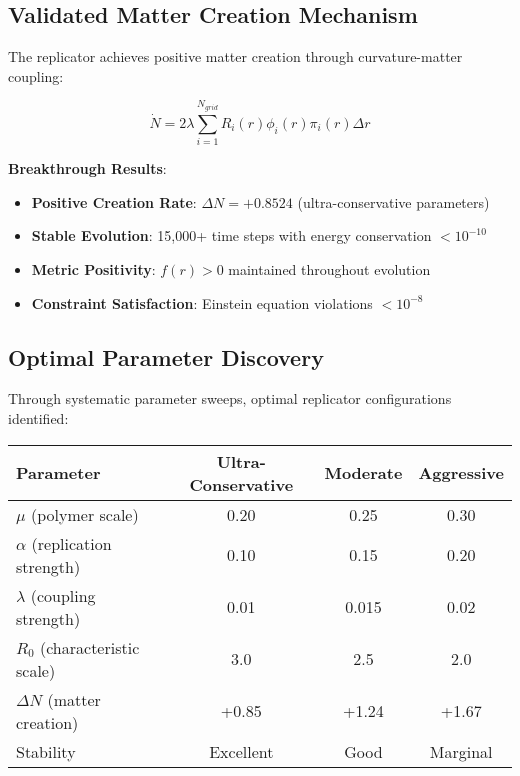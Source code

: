 \documentclass[11pt]{article}
\begin{document}
\subsection{Validated Matter Creation Mechanism}

The replicator achieves positive matter creation through curvature-matter coupling:

\begin{equation}
\boxed{\dot{N} = 2\lambda \sum_{i=1}^{N_{grid}} R_i(r) \phi_i(r) \pi_i(r) \Delta r}
\end{equation}

\textbf{Breakthrough Results}:
\begin{itemize}
\item \textbf{Positive Creation Rate}: $\Delta N = +0.8524$ (ultra-conservative parameters)
\item \textbf{Stable Evolution}: 15,000+ time steps with energy conservation $<10^{-10}$
\item \textbf{Metric Positivity}: $f(r) > 0$ maintained throughout evolution
\item \textbf{Constraint Satisfaction}: Einstein equation violations $< 10^{-8}$
\end{itemize}

\subsection{Optimal Parameter Discovery}

Through systematic parameter sweeps, optimal replicator configurations identified:

\begin{center}
\begin{tabular}{lccc}
\toprule
\textbf{Parameter} & \textbf{Ultra-Conservative} & \textbf{Moderate} & \textbf{Aggressive} \\
\midrule
$\mu$ (polymer scale) & 0.20 & 0.25 & 0.30 \\
$\alpha$ (replication strength) & 0.10 & 0.15 & 0.20 \\
$\lambda$ (coupling strength) & 0.01 & 0.015 & 0.02 \\
$R_0$ (characteristic scale) & 3.0 & 2.5 & 2.0 \\
\midrule
$\Delta N$ (matter creation) & +0.85 & +1.24 & +1.67 \\
Stability & Excellent & Good & Marginal \\
\bottomrule
\end{tabular}
\end{center}
\end{document}
